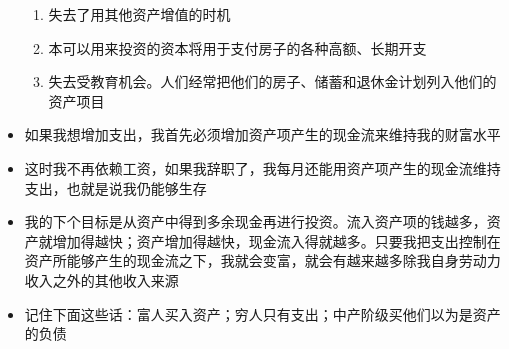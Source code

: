 \documentclass[UTF8,a4paper,8pt]{ctexbook}
\begin{document}
\begin{itemize}
\begin{enumerate}
					\item 失去了用其他资产增值的时机
					\item 本可以用来投资的资本将用于支付房子的各种高额、长期开支
					\item 失去受教育机会。人们经常把他们的房子、储蓄和退休金计划列入他们的资产项目
				\end{enumerate}
			\item 如果我想增加支出，我首先必须增加资产项产生的现金流来维持我的财富水平
			\item 这时我不再依赖工资，如果我辞职了，我每月还能用资产项产生的现金流维持支出，也就是说我仍能够生存
			\item 我的下个目标是从资产中得到多余现金再进行投资。流入资产项的钱越多，资产就增加得越快；资产增加得越快，现金流入得就越多。只要我把支出控制在资产所能够产生的现金流之下，我就会变富，就会有越来越多除我自身劳动力收入之外的其他收入来源
			
			\item 记住下面这些话：富人买入资产；穷人只有支出；中产阶级买他们以为是资产的负债
			

\end{itemize}
\end{document}
